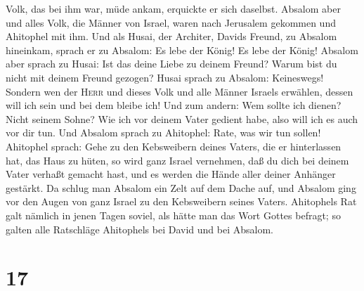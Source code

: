Volk, das bei ihm war, müde ankam, erquickte er sich daselbst.
 Absalom aber und alles Volk, die Männer von Israel,
waren nach Jerusalem gekommen und Ahitophel mit ihm.  Und
als Husai, der Architer, Davids Freund, zu Absalom hineinkam, sprach er
zu Absalom: Es lebe der König! Es lebe der König! 
Absalom aber sprach zu Husai: Ist das deine Liebe zu deinem Freund?
Warum bist du nicht mit deinem Freund gezogen?  Husai
sprach zu Absalom: Keineswegs! Sondern wen der \textsc{Herr} und dieses
Volk und alle Männer Israels erwählen, dessen will ich sein und bei dem
bleibe ich!  Und zum andern: Wem sollte ich dienen? Nicht
seinem Sohne? Wie ich vor deinem Vater gedient habe, also will ich es
auch vor dir tun.  Und Absalom sprach zu Ahitophel: Rate,
was wir tun sollen!  Ahitophel sprach: Gehe zu den
Kebsweibern deines Vaters, die er hinterlassen hat, das Haus zu hüten,
so wird ganz Israel vernehmen, daß du dich bei deinem Vater verhaßt
gemacht hast, und es werden die Hände aller deiner Anhänger gestärkt.
 Da schlug man Absalom ein Zelt auf dem Dache auf, und
Absalom ging vor den Augen von ganz Israel zu den Kebsweibern seines
Vaters.  Ahitophels Rat galt nämlich in jenen Tagen
soviel, als hätte man das Wort Gottes befragt; so galten alle Ratschläge
Ahitophels bei David und bei Absalom.

\hypertarget{section-16}{%
\section{17}\label{section-16}}

